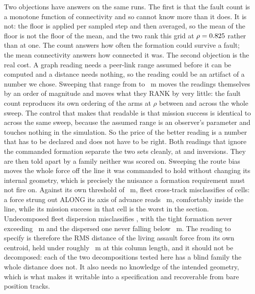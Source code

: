 \documentclass[11pt]{article}
\begin{document}
Two objections have answers on the same runs. The first is that the fault count is a monotone function of connectivity and so cannot know more than it does. It is not: the floor is applied per sampled step and then averaged, so the mean of the floor is not the floor of the mean, and the two rank this grid at $\rho = 0.825{}$ rather than at one. The count answers how often the formation could survive a fault; the mean connectivity answers how connected it was. The second objection is the real cost. A graph reading needs a peer-link range assumed before it can be computed and a distance needs nothing, so the reading could be an artifact of a number we chose. Sweeping that range from \GrRangeLo{} to \GrRangeHi{}~m moves the readings themselves by an order of magnitude and moves what they RANK by very little: the fault count reproduces its own ordering of the arms at $\rho$ between \GrRangeWorst{} and \GrRangeBest{} across the whole sweep. The control that makes that readable is that mission success is identical to \GrRangeInert{} across the same sweep, because the assumed range is an observer's parameter and touches nothing in the simulation. So the price of the better reading is a number that has to be declared and does not have to be right.
Both readings that ignore the commanded formation separate the two sets cleanly, at
\DsSpreadInv{} and \DsFCrossInv{} inversions. They are then told apart by a family neither was
scored on. Sweeping the route bias moves the whole force off the line it was commanded to hold
without changing its internal geometry, which is precisely the nuisance a formation requirement must
not fire on. Against its own threshold of \DsFCrossThresh{}~m, fleet cross-track misclassifies
\DbFCrossMiss{} of \DbFCrossCells{} cells: a force strung out ALONG its axis of advance reads
\DbFCrossWideLo{}~m, comfortably inside the line, while its mission success in that cell is the worst
in the section. Undecomposed fleet dispersion misclassifies \DbSpreadMiss{}, with the tight
formation never exceeding \DbSpreadTightHi{}~m and the dispersed one never falling below
\DbSpreadWideLo{}~m. The reading to specify is therefore the RMS distance of the living assault force
from its own centroid, held under roughly \DsSpreadThresh{}~m at this column length, and it should
not be decomposed: each of the two decompositions tested here has a blind family the whole distance
does not. It also needs no knowledge of the intended geometry, which is what makes it writable into
a specification and recoverable from bare position tracks.
\end{document}
